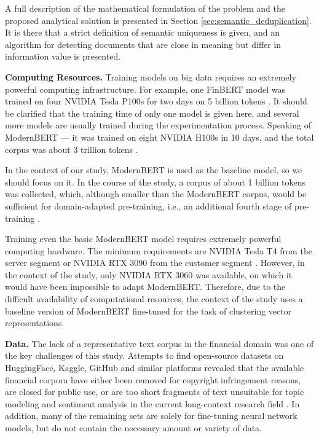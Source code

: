 A full description of the mathematical formulation of the problem and the proposed analytical
solution is presented in Section \ref{sec:semantic_deduplication}. It is there that a strict
definition of semantic uniqueness is given, and an algorithm for detecting documents that
are close in meaning but differ in information value is presented.

\textbf{Computing Resources.} Training models on big data requires an extremely powerful computing
infrastructure. For example, one FinBERT model was trained on four NVIDIA Tesla P100s for two
days on 5 billion tokens \parencite{Yang2020FinBERT}. It should be clarified that the training time of only one
model is given here, and several more models are usually trained during the experimentation
process. Speaking of ModernBERT --- it was trained on eight NVIDIA H100s in 10 days, and the total
corpus was about 3 trillion tokens \parencite{Warner2024ModernBERT}.

In the context of our study, ModernBERT is used as the baseline model, so we should focus on it.
In the course of the study, a corpus of about 1 billion tokens was collected, which, although smaller
than the ModernBERT corpus, would be sufficient for domain-adapted pre-training, i.e., an additional
fourth stage of pre-training \parencite{Warner2024ModernBERT, gururangan2020DAPT}.

Training even the basic ModernBERT model requires extremely powerful computing hardware. The minimum
requirements are NVIDIA Tesla T4 from the server segment or NVIDIA RTX 3090 from the customer segment
\parencite{Warner2024ModernBERT}. However, in the context of the study, only NVIDIA RTX 3060 was available,
on which it would have been impossible to adapt ModernBERT. Therefore, due to the difficult availability
of computational resources, the context of the study uses a baseline version of ModernBERT fine-tuned
for the task of clustering vector representations.

\textbf{Data.} The lack of a representative text corpus in the financial domain was one of the key challenges
of this study. Attempts to find open-source datasets on HuggingFace, Kaggle, GitHub and similar platforms
revealed that the available financial corpora have either been removed for copyright infringement reasons,
are closed for public use, or are too short fragments of text unsuitable for topic modeling and sentiment
analysis in the current long-context research field
\parencite{FiQA2018SA, Malo2014FPB, daudert2022multi, FSA2020problems, wiebe2005annotating}.
In addition, many of the remaining sets are solely for fine-tuning neural network models, but do not
contain the necessary amount or variety of data.

